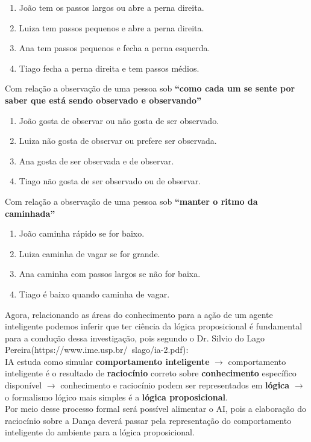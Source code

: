 \begin{enumerate}[label=\alph*)]
	\item João tem os passos largos ou abre a perna direita.
	\item Luiza tem passos pequenos e abre a perna direita.
	\item Ana tem passos pequenos e fecha a perna esquerda.
	\item Tiago fecha a perna direita e tem passos médios.
\end{enumerate}

Com relação a observação de uma pessoa sob \textbf{``como cada um se sente por saber que está sendo observado e observando''}

\begin{enumerate}[label=\alph*)]
	\item João gosta de observar ou não gosta de ser observado.
	\item Luiza não gosta de observar ou prefere ser observada.
	\item Ana gosta de ser observada e de observar.
	\item Tiago não gosta de ser observado ou de observar.
\end{enumerate}

Com relação a observação de uma pessoa sob \textbf{``manter o ritmo da caminhada''}

\begin{enumerate}[label=\alph*)]
	\item João caminha rápido se for baixo.
	\item Luiza caminha de vagar se for grande.
	\item Ana caminha com passos largos se não for baixa.
	\item Tiago é baixo quando caminha de vagar.
\end{enumerate}

Agora, relacionando as áreas do conhecimento para a ação de um agente inteligente podemos inferir que ter ciência da lógica proposicional é fundamental para a condução dessa investigação, pois segundo o Dr. Silvio do Lago Pereira(https://www.ime.usp.br/~slago/ia-2.pdf): \\
IA estuda como simular \textbf{comportamento inteligente} $ \longrightarrow $ comportamento inteligente é o resultado de \textbf{raciocínio} correto sobre \textbf{conhecimento} específico disponível $ \longrightarrow $ conhecimento e raciocínio podem ser representados em \textbf{lógica} $ \longrightarrow $ o formalismo lógico  mais simples é a \textbf{lógica proposicional}.\\
Por meio desse processo formal será possível alimentar o AI, pois a elaboração do raciocínio sobre a Dança deverá passar pela representação do comportamento inteligente do ambiente para a lógica proposicional.
 

